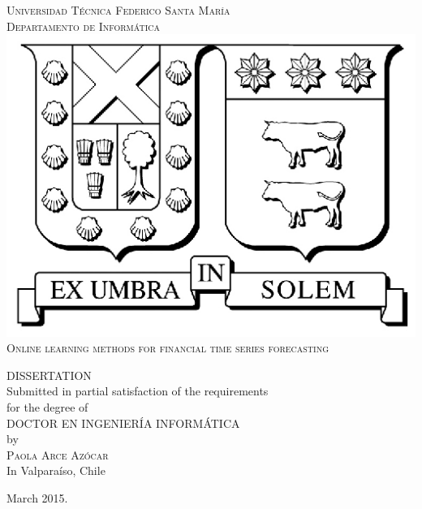 \thispagestyle{empty}
\vspace{1.5in}
\begin{center}
{\textsc{Universidad T\'ecnica Federico Santa Mar\'ia}}\\
{\textsc{Departamento de Inform\'atica}}\\
\medskip
\includegraphics[scale=1]{fig/logo_usm.eps}
\bigskip
\bigskip
\bigskip
\bigskip \\
{\textsc{\Large{{Online learning methods for financial time series forecasting}}}}\\%

\bigskip
\bigskip
\bigskip
\bigskip
\bigskip 

{\MakeUppercase{Dissertation}\\
\bigskip
\bigskip
Submitted in partial satisfaction of the requirements\\
for the degree of\\
\bigskip
\bigskip
\MakeUppercase{Doctor en Ingenier\'ia Inform\'atica}\\
\bigskip
\bigskip
by\\
\bigskip
{\textsc{\large{Paola Arce Az\'ocar}}}\\
\bigskip
\bigskip
In Valpara\'iso, Chile}
\end{center}

\begin{center}
{\normalsize March 2015.}
\end{center}

\pagebreak

